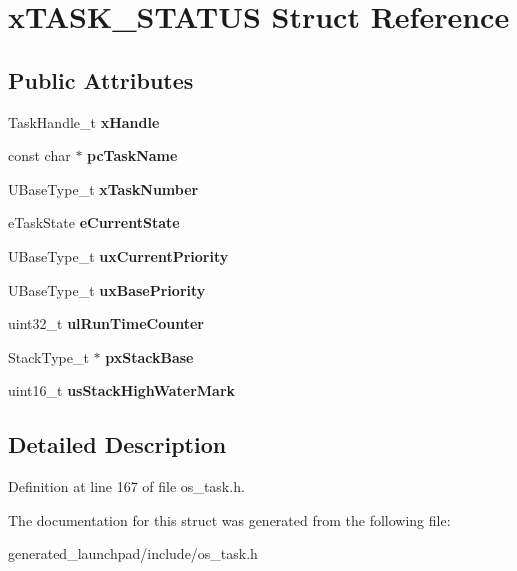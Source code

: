 \hypertarget{structxTASK__STATUS}{}\section{x\+T\+A\+S\+K\+\_\+\+S\+T\+A\+T\+US Struct Reference}
\label{structxTASK__STATUS}
\subsection*{Public Attributes}
\begin{DoxyCompactItemize}
\item 
\mbox{\label{structxTASK__STATUS_ac57f825f365c3c64bba827285fe3c2a0}} 
Task\+Handle\+\_\+t {\bfseries x\+Handle}
\item 
\mbox{\label{structxTASK__STATUS_ad272663e2560bd9ea088384a39ba6192}} 
const char $\ast$ {\bfseries pc\+Task\+Name}
\item 
\mbox{\label{structxTASK__STATUS_acd44468ba37270b04f83d0833c098057}} 
U\+Base\+Type\+\_\+t {\bfseries x\+Task\+Number}
\item 
\mbox{\label{structxTASK__STATUS_a727e904e3afe49472b0fc6a4e96439cb}} 
e\+Task\+State {\bfseries e\+Current\+State}
\item 
\mbox{\label{structxTASK__STATUS_a39df647234fc0d6de5852042a2741a94}} 
U\+Base\+Type\+\_\+t {\bfseries ux\+Current\+Priority}
\item 
\mbox{\label{structxTASK__STATUS_a692f4c8957b7270f1579cdee63ff287e}} 
U\+Base\+Type\+\_\+t {\bfseries ux\+Base\+Priority}
\item 
\mbox{\label{structxTASK__STATUS_a92ab83f4f376c255dedf8e06a78261f7}} 
uint32\+\_\+t {\bfseries ul\+Run\+Time\+Counter}
\item 
\mbox{\label{structxTASK__STATUS_a0ee59674d2cc57d3a5a29c777d5452ed}} 
Stack\+Type\+\_\+t $\ast$ {\bfseries px\+Stack\+Base}
\item 
\mbox{\label{structxTASK__STATUS_a284892acd41bff7c319295687a95af6b}} 
uint16\+\_\+t {\bfseries us\+Stack\+High\+Water\+Mark}
\end{DoxyCompactItemize}


\subsection{Detailed Description}


Definition at line 167 of file os\+\_\+task.\+h.



The documentation for this struct was generated from the following file\+:\begin{DoxyCompactItemize}
\item 
generated\+\_\+launchpad/include/os\+\_\+task.\+h\end{DoxyCompactItemize}
